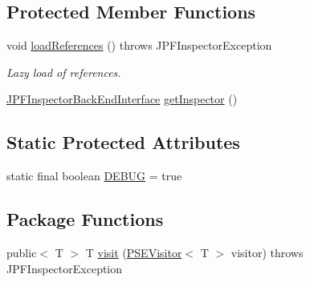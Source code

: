 \subsection*{Protected Member Functions}
\begin{DoxyCompactItemize}
\item 
void \hyperlink{classgov_1_1nasa_1_1jpf_1_1inspector_1_1common_1_1pse_1_1_p_s_e_thread_a47fdf50072bc188497f76ad651a5ea3e}{load\+References} ()  throws J\+P\+F\+Inspector\+Exception 
\begin{DoxyCompactList}\small\item\em Lazy load of references. \end{DoxyCompactList}\item 
\hyperlink{interfacegov_1_1nasa_1_1jpf_1_1inspector_1_1interfaces_1_1_j_p_f_inspector_back_end_interface}{J\+P\+F\+Inspector\+Back\+End\+Interface} \hyperlink{classgov_1_1nasa_1_1jpf_1_1inspector_1_1common_1_1pse_1_1_program_state_entry_ab04eadea7420b70405969a6b95656411}{get\+Inspector} ()
\end{DoxyCompactItemize}
\subsection*{Static Protected Attributes}
\begin{DoxyCompactItemize}
\item 
static final boolean \hyperlink{classgov_1_1nasa_1_1jpf_1_1inspector_1_1common_1_1pse_1_1_program_state_entry_a84ef5e9f23ec651d7a67a8ee72819b0e}{D\+E\+B\+UG} = true
\end{DoxyCompactItemize}
\subsection*{Package Functions}
\begin{DoxyCompactItemize}
\item 
public$<$ T $>$ T \hyperlink{classgov_1_1nasa_1_1jpf_1_1inspector_1_1common_1_1pse_1_1_p_s_e_thread_a6de2ca44a0f0e827e0d5002c135b9efb}{visit} (\hyperlink{interfacegov_1_1nasa_1_1jpf_1_1inspector_1_1common_1_1pse_1_1_p_s_e_visitor}{P\+S\+E\+Visitor}$<$ T $>$ visitor)  throws J\+P\+F\+Inspector\+Exception 
\end{DoxyCompactItemize}
